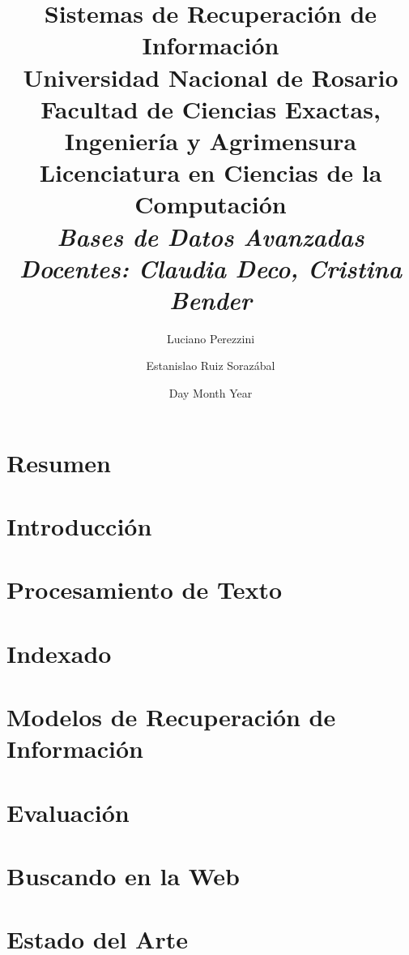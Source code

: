 \documentclass[11pt, spanish]{report}
\title{
	{\huge Sistemas de Recuperación de Información}\\
	{\Large Universidad Nacional de Rosario}\\
	{\large Facultad de Ciencias Exactas, Ingeniería y Agrimensura}\\
	{\small Licenciatura en Ciencias de la Computación}\\
	{\small {\itshape Bases de Datos Avanzadas}} \\
	{\small {\itshape Docentes: Claudia Deco, Cristina Bender}} \\
}
\author{Luciano Perezzini \and Estanislao Ruiz Sorazábal}
\date{Day Month Year}
\begin{document}
	\maketitle
	
	\chapter*{Resumen}
		
	
	\tableofcontents
	
	\chapter{Introducción}
		

	\chapter{Procesamiento de Texto}
		
		
	\chapter{Indexado}
		
		
		
	\chapter{Modelos de Recuperación de Información}
		
		
	\chapter{Evaluación}
		
		
	\chapter{Buscando en la Web}
		

	\chapter{Estado del Arte}
		
\end{document}
